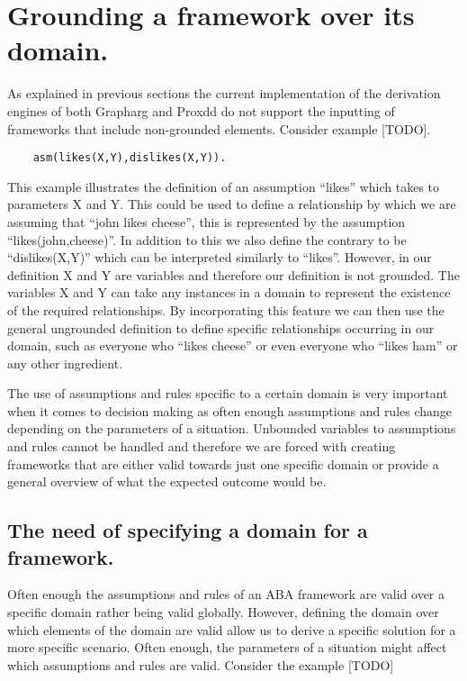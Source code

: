 \newpage

\chapter{Grounding a framework over its domain.}

As explained in previous sections the current implementation of the derivation engines of both Grapharg and Proxdd do not support the inputting of frameworks that include non-grounded elements. Consider example [TODO].

\begin{verbatim}
	asm(likes(X,Y),dislikes(X,Y)).
\end{verbatim}

This example illustrates the definition of an assumption ``likes'' which takes to parameters X and Y. This could be used to define a relationship by which we are assuming that ``john likes cheese'', this is represented by the assumption ``likes(john,cheese)''. In addition to this we also define the contrary to be ``dislikes(X,Y)'' which can be interpreted similarly to ``likes''. However, in our definition X and Y are variables and therefore our definition is not grounded. The variables X and Y can take any instances in a domain to represent the existence of the required relationships. By incorporating this feature we can then use the general ungrounded definition to define specific relationships occurring in our domain, such as everyone who ``likes cheese'' or even everyone who ``likes ham'' or any other ingredient.

The use of assumptions and rules specific to a certain domain is very important when it comes to decision making as often enough assumptions and rules change depending on the parameters of a situation. Unbounded variables to assumptions and rules cannot be handled and therefore we are forced with creating frameworks that are either valid towards just one specific domain or provide a general overview of what the expected outcome would be.

\section{The need of specifying a domain for a framework.}

Often enough the assumptions and rules of an ABA framework are valid over a specific domain rather being valid globally. However, defining the domain over which elements of the domain are valid allow us to derive a specific solution for a more specific scenario. Often enough, the parameters of a situation might  affect which assumptions and rules are valid. Consider the example [TODO]

